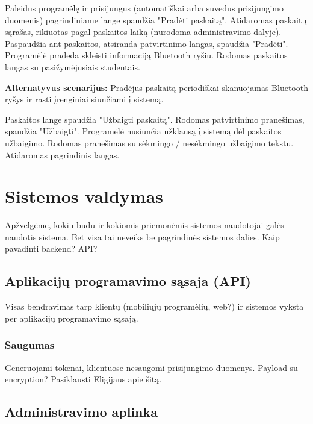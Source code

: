 \documentclass{VUMIFPSkursinis}
\begin{document}

Paleidus programėlę ir prisijungus (automatiškai arba suvedus prisijungimo duomenis) pagrindiniame lange spaudžia "Pradėti paskaitą". Atidaromas paskaitų sąrašas, rikiuotas pagal paskaitos laiką (nurodoma administravimo dalyje). Paspaudžia ant paskaitos, atsiranda patvirtinimo langas, spaudžia "Pradėti". Programėlė pradeda skleisti informaciją Bluetooth ryšiu. Rodomas paskaitos langas su pasižymėjusiais studentais.

\textbf{Alternatyvus scenarijus:} Pradėjus paskaitą periodiškai skanuojamas Bluetooth ryšys ir rasti įrenginiai siunčiami į sistemą.


Paskaitos lange spaudžia "Užbaigti paskaitą". Rodomas patvirtinimo pranešimas, spaudžia "Užbaigti". Programėlė nusiunčia užklausą į sistemą dėl paskaitos užbaigimo. Rodomas pranešimas su sėkmingo / nesėkmingo užbaigimo tekstu. Atidaromas pagrindinis langas.

\section{Sistemos valdymas}

Apžvelgėme, kokiu būdu ir kokiomis priemonėmis sistemos naudotojai galės naudotis sistema. Bet visa tai neveiks be pagrindinės sistemos dalies. Kaip pavadinti backend? API?

\subsection{Aplikacijų programavimo sąsaja (API)}

Visas bendravimas tarp klientų (mobiliųjų programėlių, web?) ir sistemos vyksta per aplikacijų programavimo sąsają.

\subsubsection{Saugumas}

Generuojami tokenai, klientuose nesaugomi prisijungimo duomenys. Payload su encryption? Pasiklausti Eligijaus apie šitą.

\subsection{Administravimo aplinka}
\end{document}
